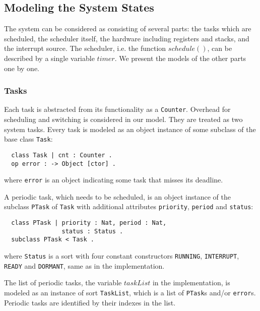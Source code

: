 \documentclass[10pt,journal]{IEEEtran}
\newcommand{\hide}[1]{\ignorespaces}
\begin{document}
{\subsection{Modeling the System States}
The system can be considered as consisting of several parts: the tasks
which are scheduled, the scheduler itself, the hardware including
registers and stacks, and the interrupt source. The scheduler,
i.e. the function $schedule()$, can be described by a single variable
$timer$. We present the models of the other parts one by one.

\subsubsection{Tasks}
Each task is abstracted from its functionality as a \verb|Counter|.
Overhead for scheduling and switching is considered in our model. They
are treated as two system tasks. Every task is modeled as an object
instance of some subclass of the base class \verb|Task|:
\begin{verbatim}
  class Task | cnt : Counter .
  op error : -> Object [ctor] .
\end{verbatim}
where \verb|error| is an object indicating some task that misses its
deadline.

A periodic task, which needs to be scheduled, is an object instance of
the subclass \verb|PTask| of \verb|Task| with additional attributes
\verb|priority|, \verb|period| and \verb|status|:
\begin{verbatim}
  class PTask | priority : Nat, period : Nat, 
                status : Status .
  subclass PTask < Task .
\end{verbatim}
where \verb|Status| is a sort with four constant constructors
\verb|RUNNING|, \verb|INTERRUPT|, \verb|READY| and \verb|DORMANT|,
same as in the implementation.
\hide{
\begin{verbatim}
  ops RUNNING INTERRUPT READY DORMANT 
        : -> Status [ctor] .
\end{verbatim}
} 

The list of periodic tasks, the variable $taskList$ in the
implementation, is modeled as an instance of sort \verb|TaskList|,
which is a list of \verb|PTask|s and/or \verb|error|s.
\hide{
\begin{verbatim}
  op null : -> TaskList [ctor] .
  op _::_ : Object TaskList 
              ~> TaskList [ctor] .
  mb (< O:Oid : PTask |> :: L:TaskList) 
       : TaskList .
  mb (error :: L:TaskList) : TaskList .
\end{verbatim}
}
Periodic tasks are identified by their indexes in the list.

}
\end{document}
